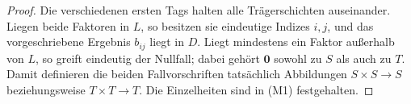 \documentclass[main.tex]{subfiles}
\begin{document}
\begin{proof}
Die verschiedenen ersten Tags halten alle Trägerschichten auseinander.
Liegen beide Faktoren in \(L\),
so besitzen sie eindeutige Indizes \(i,j\), und das vorgeschriebene Ergebnis
\(b_{ij}\) liegt in \(D\). Liegt mindestens ein Faktor außerhalb von \(L\),
so greift eindeutig der Nullfall; dabei gehört \(\mathbf0\) sowohl zu \(S\)
als auch zu \(T\). Damit definieren die beiden Fallvorschriften tatsächlich
Abbildungen \(S\times S\to S\) beziehungsweise \(T\times T\to T\). Die
Einzelheiten sind in \textup{(M1)} festgehalten.
\end{proof}

\MogTableProofHeading
\begin{tabproofwide}
\end{tabproofwide}
\end{document}
